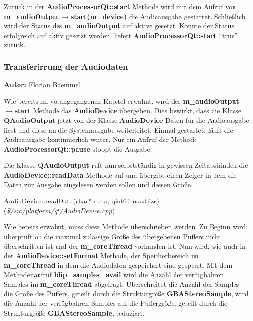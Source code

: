 \documentclass[11pt,a4paper]{scrartcl}
\newcommand{\AutorFlorian} {
    \vspace{-4mm}
    \large \textbf{Autor:} Florian Boemmel \normalsize
    \vspace{2mm}
}
\begin{document}
Zur\"uck in der \textbf{AudioProcessorQt::start} Methode wird mit dem Aufruf von \textbf{m\_audioOutput$\rightarrow$start(m\_device)} die Audioausgabe gestartet. Schlie{\ss}lich wird der Status des \textbf{m\_audioOutput} auf aktive gesetzt.
Konnte der Status erfolgreich auf aktiv gesetzt werden, liefert \textbf{AudioProcessorQt::start} "`true"' zur\"uck.
 
\subsubsection{Transferirrung der Audiodaten}
\AutorFlorian

Wie bereits im vorangegangenen Kapitel erw\"ahnt, wird der \textbf{m\_audioOutput$\rightarrow$start} Methode das \textbf{AudioDevice} \"ubergeben. Dies bewirkt, dass die Klasse \textbf{QAudioOutput} jetzt von der Klasse \textbf{AudioDevice} 
Daten f\"ur die Audioausgabe liest und diese an die Systemausgabe weiterleitet. Einmal gestartet, l\"auft die Audioausgabe kontinuierlich weiter. Nur ein Aufruf der Methode \textbf{AudioProcessorQt::pause} stoppt die Ausgabe.

Die Klasse \textbf{QAudioOutput} ruft nun selbstst\"andig  in gewissen Zeitabst\"anden die \textbf{AudioDevice::readData} Methode auf und \"ubergibt einen Zeiger in dem die Daten zur Ausgabe eingelesen werden sollen und dessen Gr\"o{\ss}e.

\vspace{5mm}
\large AudioDevice::readData(char* data, qint64 maxSize) \normalsize(\textit{\$/src/platform/qt/AudioDevice.cpp})
\vspace{2mm}\newline

Wie bereits erw\"ahnt, muss diese Methode \"uberschrieben werden. Zu Beginn wird \"uberpr\"uft ob die maximal zul\"assige Gr\"o{\ss}e des \"ubergebenen Puffers nicht \"uberschritten ist und der \textbf{m\_coreThread} vorhanden ist.
Nun wird, wie auch in der \textbf{AudioDevice::setFormat} Methode, der Speicherbereich im \textbf{m\_coreThread} in dem die Audiodaten gespeichert sind gesperrt.
Mit dem Methodenaufruf \textbf{blip\_samples\_avail} wird die Anzahl der verf\"ugbahren Samples im \textbf{m\_coreThread} abgefragt. \"Uberschreitet die Anzahl der Samples die Gr\"o{\ss}e des Puffers, geteilt durch die 
Strukturgr\"o{\ss}e \textbf{GBAStereoSample}, wird die Anzahl der verf\"ugbahren Samples auf die Puffergr\"o{\ss}e, geteilt durch die Strukturgr\"o{\ss}e \textbf{GBAStereoSample}, reduziert.
\end{document}
